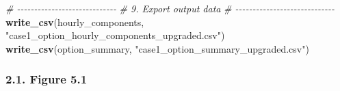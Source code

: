 \documentclass[
]{article}
\newenvironment{Shaded}{\begin{snugshade}}{\end{snugshade}}
\newcommand{\CommentTok}[1]{\textcolor[rgb]{0.56,0.35,0.01}{\textit{#1}}}
\newcommand{\FunctionTok}[1]{\textcolor[rgb]{0.13,0.29,0.53}{\textbf{#1}}}
\newcommand{\NormalTok}[1]{#1}
\newcommand{\StringTok}[1]{\textcolor[rgb]{0.31,0.60,0.02}{#1}}
\begin{document}
\begin{Shaded}
\begin{Highlighting}[]
\CommentTok{\# {-}{-}{-}{-}{-}{-}{-}{-}{-}{-}{-}{-}{-}{-}{-}{-}{-}{-}{-}{-}{-}{-}{-}{-}{-}{-}{-}{-}{-}}
\CommentTok{\# 9. Export output data}
\CommentTok{\# {-}{-}{-}{-}{-}{-}{-}{-}{-}{-}{-}{-}{-}{-}{-}{-}{-}{-}{-}{-}{-}{-}{-}{-}{-}{-}{-}{-}{-}}
\FunctionTok{write\_csv}\NormalTok{(hourly\_components, }\StringTok{"case1\_option\_hourly\_components\_upgraded.csv"}\NormalTok{)}
\FunctionTok{write\_csv}\NormalTok{(option\_summary, }\StringTok{"case1\_option\_summary\_upgraded.csv"}\NormalTok{)}
\end{Highlighting}
\end{Shaded}

\subsubsection{2.1. Figure 5.1}\label{figure-5.1}
\end{document}
